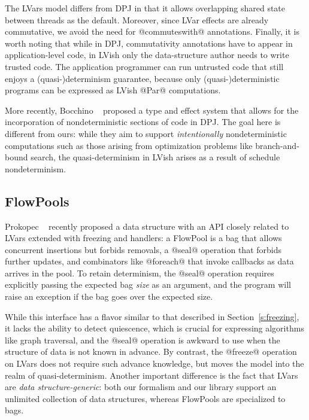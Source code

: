 \documentclass{article}
\begin{document}
The LVars model differs from DPJ in that it allows overlapping shared
state between threads as the default.  Moreover, since LVar effects
are already commutative, we avoid the need for @commuteswith@
annotations.  Finally, it is worth noting that while in DPJ,
commutativity annotations have to appear in application-level code, in
LVish only the data-structure author needs to write trusted code. The
application programmer can run untrusted code that still enjoys a
(quasi-)determinism guarantee, because only (quasi-)deterministic
programs can be expressed as LVish @Par@ computations.

More recently, Bocchino \etal~\cite{dpj-popl} proposed a type and
effect system that allows for the incorporation of nondeterministic
sections of code in DPJ.  The goal here is different from ours: while
they aim to support \emph{intentionally} nondeterministic computations
such as those arising from optimization problems like branch-and-bound
search, the quasi-determinism in LVish arises as a result of schedule
nondeterminism.

\subsection{FlowPools}

Prokopec \etal~\cite{flowpools} recently proposed a data structure
with an API closely related to LVars extended with freezing and
handlers: a FlowPool is a bag that allows concurrent insertions but
forbids removals, a @seal@ operation that forbids further updates,
and combinators like @foreach@ that invoke callbacks as data
arrives in the pool.  To retain determinism, the @seal@ operation
requires explicitly passing the expected bag \emph{size} as an
argument, and the program will raise an exception if the bag goes over
the expected size.

While this interface has a flavor similar to that described in
Section~\ref{s:freezing}, it lacks the ability to detect quiescence,
which is crucial for expressing algorithms like graph traversal, and
the @seal@ operation is awkward to use when the structure of data is
not known in advance.  By contrast, the @freeze@ operation on LVars
does not require such advance knowledge, but moves the model into the
realm of quasi-determinism.  Another important difference is the fact
that LVars are \emph{data structure-generic}: both our formalism and
our library support an unlimited collection of data structures,
whereas FlowPools are specialized to bags.
\end{document}
